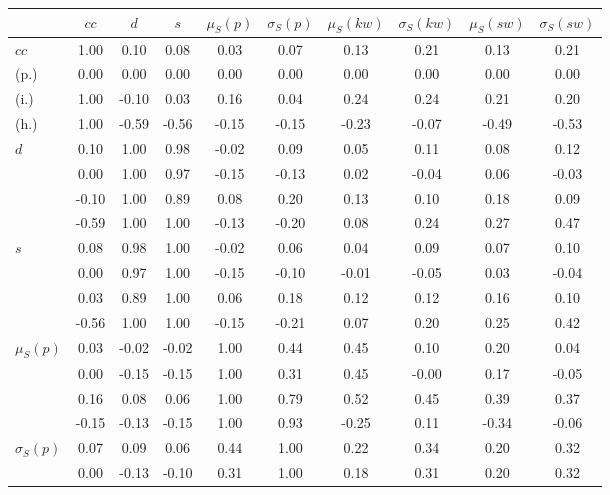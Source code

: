 \begin{table*}[h!]
\begin{center}
\begin{tabular}{| l | c | c | c | c | c | c | c | c | c |}\hline
 & $cc$ & $d$ & $s$ & $\mu_S(p)$ & $\sigma_S(p)$ & $\mu_S(kw)$ & $\sigma_S(kw)$ & $\mu_S(sw)$ & $\sigma_S(sw)$ \\\hline
$cc$ & 1.00  & 0.10  & 0.08  & 0.03  & 0.07  & 0.13  & 0.21  & 0.13  & 0.21 \\\hline
(p.) & 0.00  & 0.00  & 0.00  & 0.00  & 0.00  & 0.00  & 0.00  & 0.00  & 0.00 \\\hline
(i.) & 1.00  & -0.10  & 0.03  & 0.16  & 0.04  & 0.24  & 0.24  & 0.21  & 0.20 \\\hline
(h.) & 1.00  & -0.59  & -0.56  & -0.15  & -0.15  & -0.23  & -0.07  & -0.49  & -0.53 \\\hline
$d$ & 0.10  & 1.00  & 0.98  & -0.02  & 0.09  & 0.05  & 0.11  & 0.08  & 0.12 \\\hline
 & 0.00  & 1.00  & 0.97  & -0.15  & -0.13  & 0.02  & -0.04  & 0.06  & -0.03 \\\hline
 & -0.10  & 1.00  & 0.89  & 0.08  & 0.20  & 0.13  & 0.10  & 0.18  & 0.09 \\\hline
 & -0.59  & 1.00  & 1.00  & -0.13  & -0.20  & 0.08  & 0.24  & 0.27  & 0.47 \\\hline
$s$ & 0.08  & 0.98  & 1.00  & -0.02  & 0.06  & 0.04  & 0.09  & 0.07  & 0.10 \\\hline
 & 0.00  & 0.97  & 1.00  & -0.15  & -0.10  & -0.01  & -0.05  & 0.03  & -0.04 \\\hline
 & 0.03  & 0.89  & 1.00  & 0.06  & 0.18  & 0.12  & 0.12  & 0.16  & 0.10 \\\hline
 & -0.56  & 1.00  & 1.00  & -0.15  & -0.21  & 0.07  & 0.20  & 0.25  & 0.42 \\\hline
$\mu_S(p)$ & 0.03  & -0.02  & -0.02  & 1.00  & 0.44  & 0.45  & 0.10  & 0.20  & 0.04 \\\hline
 & 0.00  & -0.15  & -0.15  & 1.00  & 0.31  & 0.45  & -0.00  & 0.17  & -0.05 \\\hline
 & 0.16  & 0.08  & 0.06  & 1.00  & 0.79  & 0.52  & 0.45  & 0.39  & 0.37 \\\hline
 & -0.15  & -0.13  & -0.15  & 1.00  & 0.93  & -0.25  & 0.11  & -0.34  & -0.06 \\\hline
$\sigma_S(p)$ & 0.07  & 0.09  & 0.06  & 0.44  & 1.00  & 0.22  & 0.34  & 0.20  & 0.32 \\\hline
 & 0.00  & -0.13  & -0.10  & 0.31  & 1.00  & 0.18  & 0.31  & 0.20  & 0.32 \\\hline

\end{tabular}
\end{center}
\end{table*}
